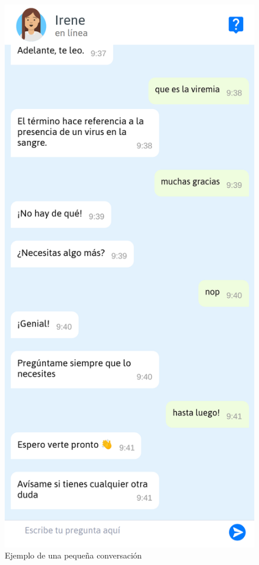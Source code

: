 \begin{figure}[htbp]
\includegraphics[scale=0.15]{../images/basics_chat_2.png}
\caption{Ejemplo de una pequeña conversación}
\label{fig:expresiones auxiliares}
\end{figure}



